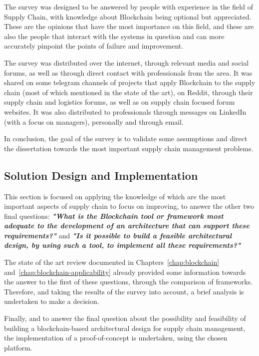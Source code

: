 The survey was designed to be answered by people with experience in the field of Supply Chain, with knowledge about Blockchain being optional but appreciated. These are the opinions that have the most importance on this field, and these are also the people that interact with the systems in question and can more accurately pinpoint the points of failure and improvement.

The survey was distributed over the internet, through relevant media and social forums, as well as through direct contact with professionals from the area. It was shared on some telegram channels of projects that apply Blockchain to the supply chain (most of which mentioned in the state of the art), on Reddit, through their supply chain and logistics forums, as well as on supply chain focused forum websites. It was also distributed to professionals through messages on LinkedIn (with a focus on managers), personally and through email.

In conclusion, the goal of the survey is to validate some assumptions and direct the dissertation towards the most important supply chain management problems.

\subsection{Solution Design and Implementation}

This section is focused on applying the knowledge of which are the most important aspects of supply chain to focus on improving, to answer the other two final questions: \textbf{\textit{"What is the Blockchain tool or framework most adequate to the development of an architecture that can support these requirements?"}} and 
\textbf{\textit{"Is it possible to build a feasible architectural design, by using such a tool, to implement all these requirements?"}}


The state of the art review documented in Chapters~\ref{chap:blockchain} and~\ref{chap:blockchain-applicability} already provided some information towards the answer to the first of these questions, through the comparison of frameworks. Therefore, and taking the results of the survey into account, a brief analysis is undertaken to make a decision.

Finally, and to answer the final question about the possibility and feasibility of building a blockchain-based architectural design for supply chain management, the implementation of a proof-of-concept is undertaken, using the chosen platform. 

